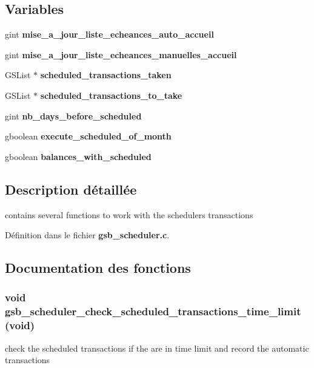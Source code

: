 \subsection*{Variables}
\begin{DoxyCompactItemize}
\item 
gint {\bf mise\_\-a\_\-jour\_\-liste\_\-echeances\_\-auto\_\-accueil}
\item 
gint {\bf mise\_\-a\_\-jour\_\-liste\_\-echeances\_\-manuelles\_\-accueil}
\item 
GSList $\ast$ {\bf scheduled\_\-transactions\_\-taken}
\item 
GSList $\ast$ {\bf scheduled\_\-transactions\_\-to\_\-take}
\item 
gint {\bf nb\_\-days\_\-before\_\-scheduled}
\item 
gboolean {\bf execute\_\-scheduled\_\-of\_\-month}
\item 
gboolean {\bf balances\_\-with\_\-scheduled}
\end{DoxyCompactItemize}


\subsection{Description détaillée}
contains several functions to work with the schedulers transactions 

Définition dans le fichier {\bf gsb\_\-scheduler.c}.



\subsection{Documentation des fonctions}
\subsubsection[{gsb\_\-scheduler\_\-check\_\-scheduled\_\-transactions\_\-time\_\-limit}]{\setlength{\rightskip}{0pt plus 5cm}void gsb\_\-scheduler\_\-check\_\-scheduled\_\-transactions\_\-time\_\-limit (void)}\label{gsb__scheduler_8c_a01be712269ce407b49b2d995af85f2bf}
check the scheduled transactions if the are in time limit and record the automatic transactions


